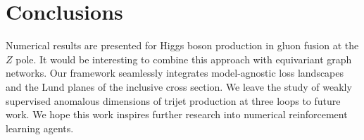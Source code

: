 \section{Conclusions}\label{sec:conclusions}

Numerical results are presented for Higgs boson production in gluon
fusion at the $Z$ pole. It would be interesting to combine this approach
with equivariant graph networks. Our framework seamlessly integrates
model-agnostic loss landscapes and the Lund planes of the inclusive
cross section. We leave the study of weakly supervised anomalous
dimensions of trijet production at three loops to future work. We hope
this work inspires further research into numerical reinforcement
learning agents.

